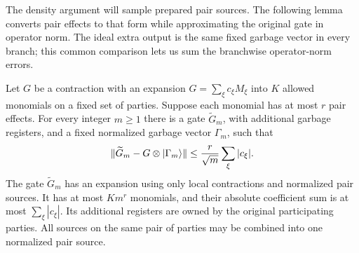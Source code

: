 The density argument will sample prepared pair sources.  The following
lemma converts pair effects to that form while approximating the original
gate in operator norm.  The ideal extra output is the same fixed garbage
vector in every branch; this common comparison lets us sum the branchwise
operator-norm errors.

\begin{lemma}
\label{lem:effects}
Let $G$ be a contraction with an expansion
$G=\sum_{\xi}c_{\xi}M_{\xi}$ into $K$ allowed monomials on a fixed set of
parties.  Suppose each monomial has at most $r$ pair effects.  For every
integer $m\ge1$ there is a gate $\widetilde G_m$, with additional garbage
registers, and a fixed normalized garbage vector $\Gamma_m$, such that
\begin{equation}
 \lVert \widetilde G_m-G\otimes|\Gamma_m\rangle\rVert
 \le \frac{r}{\sqrt m}\sum_{\xi}|c_{\xi}|.
 \label{eq:compression-effect-error}
\end{equation}
The gate $\widetilde G_m$ has an expansion using only local contractions
and normalized pair sources.  It has at most $K m^r$ monomials, and their
absolute coefficient sum is at most $\sum_{\xi}|c_{\xi}|$.  Its additional
registers are owned by the original participating parties.  All sources
on the same pair of parties may be combined into one normalized pair
source.
\end{lemma}

